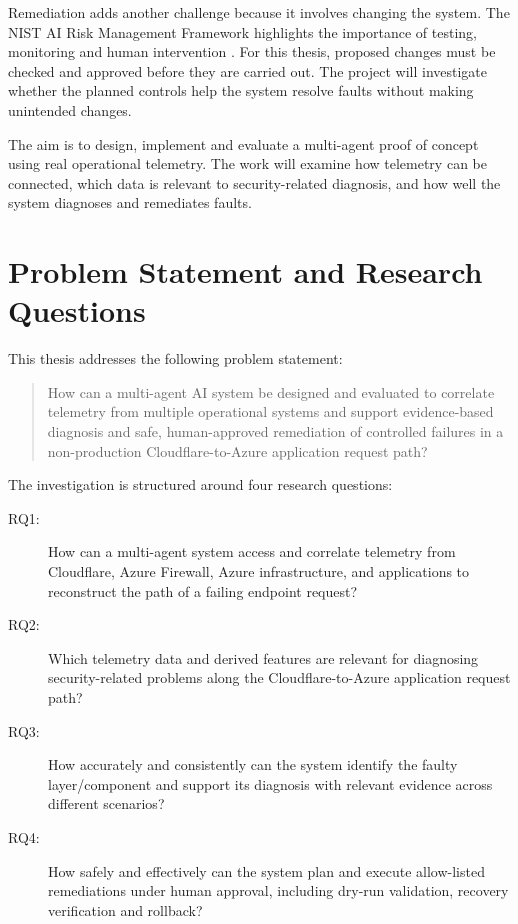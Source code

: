Remediation adds another challenge because it involves changing the system.
The NIST AI Risk Management Framework highlights the importance of testing,
monitoring and human intervention \parencite[pp.~14--15]{tabassi2023airmf}.
For this thesis, proposed changes must be checked and approved before they
are carried out. The project will investigate whether the planned controls
help the system resolve faults without making unintended changes.

The aim is to design, implement and evaluate a multi-agent proof of concept
using real operational telemetry. The work will examine how telemetry can
be connected, which data is relevant to security-related diagnosis, and how
well the system diagnoses and remediates faults.

\section{Problem Statement and Research Questions}
\label{sec:introduction:research-questions}

This thesis addresses the following problem statement:

\begin{quote}
How can a multi-agent AI system be designed and evaluated to correlate
telemetry from multiple operational systems and support evidence-based
diagnosis and safe, human-approved remediation of controlled failures in a
non-production Cloudflare-to-Azure application request path?
\end{quote}

The investigation is structured around four research questions:

\begin{description}

    \item[RQ1:] How can a multi-agent system access and correlate telemetry
    from Cloudflare, Azure Firewall, Azure infrastructure, and applications
    to reconstruct the path of a failing endpoint request?

    \item[RQ2:] Which telemetry data and derived features are relevant for
    diagnosing security-related problems along the Cloudflare-to-Azure
    application request path?

    \item[RQ3:] How accurately and consistently can the system identify the
    faulty layer/component and support its diagnosis with relevant evidence
    across different scenarios?

    \item[RQ4:] How safely and effectively can the system plan and execute
    allow-listed remediations under human approval, including dry-run
    validation, recovery verification and rollback?

\end{description}


